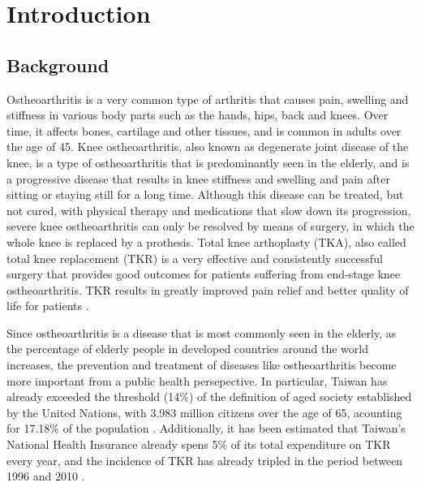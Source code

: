 \documentclass[../main.tex]{subfiles}
\begin{document}
	
\chapter{Introduction}
\section{Background}
 
 Ostheoarthritis is a very common type of arthritis that causes pain, swelling and stiffness in various body parts such as the hands, hips, back and knees. Over time, it affects bones, cartilage and other tissues, and is common in adults over the age of 45. Knee ostheoarthritis, also known as degenerate joint disease of the knee, is a type of ostheoarthritis that is predominantly seen in the elderly, and is a progressive disease that results in knee stiffness and swelling and pain after sitting or staying still for a long time. Although this disease can be treated, but not cured, with physical therapy and medications that slow down its progression, severe knee ostheoarthritis can only be resolved by means of surgery, in which the whole knee is replaced by a prothesis. Total knee arthoplasty (TKA), also called total knee replacement (TKR) is a very effective and consistently successful surgery that provides good outcomes for patients suffering from end-stage knee ostheoarthritis. TKR results in greatly improved pain relief and better quality of life for patients \cite{varacalloTotalKneeArthroplasty2025}.
 
Since ostheoarthritis is a disease that is most commonly seen in the elderly, as the percentage of elderly people in developed countries around the world increases, the prevention and treatment of diseases like ostheoarthritis become more important from a public health persepective. In particular, Taiwan has already  exceeded the threshold (14\%) of the definition of aged society established by the United Nations, with 3.983 million citizens over the age of 65, acounting for 17.18\% of the population \cite{ElderlyDisadvantagedSituation2024}. Additionally, it has been estimated that Taiwan's National Health Insurance already spens 5\% of its total expenditure on TKR every year, and the incidence of TKR has already tripled in the period between 1996 and 2010 \cite{linIncreaseTotalKnee2018}.
 
\end{document}
